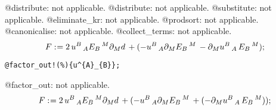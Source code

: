 \documentclass[11pt]{article}
\def\specialcolon{\mathrel{\mathop{:}}\hspace{-.5em}}
\begin{document}
@distribute: not applicable.
@distribute: not applicable.
@substitute: not applicable.
@eliminate\_kr: not applicable.
@prodsort: not applicable.
@canonicalise: not applicable.
@collect\_terms: not applicable.
\begin{dmath*}[compact, spread=2pt]
F\specialcolon{}= 2\, {u}^{B}\,_{A} {E}_{B}\,^{M} {\partial}_{M}{d}\,  + ( - {u}^{B}\,_{A} {\partial}_{M}{{E}_{B}\,^{M}}\,  - {\partial}_{M}{{u}^{B}\,_{A}}\,  {E}_{B}\,^{M});
\end{dmath*}
{\color[named]{Blue}\begin{verbatim}
@factor_out!(%){u^{A}_{B}};
\end{verbatim}}
@factor\_out: not applicable.
\begin{dmath*}[compact, spread=2pt]
F\specialcolon{}= 2\, {u}^{B}\,_{A} {E}_{B}\,^{M} {\partial}_{M}{d}\,  + ( - {u}^{B}\,_{A} {\partial}_{M}{{E}_{B}\,^{M}}\,  + ( - {\partial}_{M}{{u}^{B}\,_{A}}\,  {E}_{B}\,^{M}));
\end{dmath*}
\end{document}
